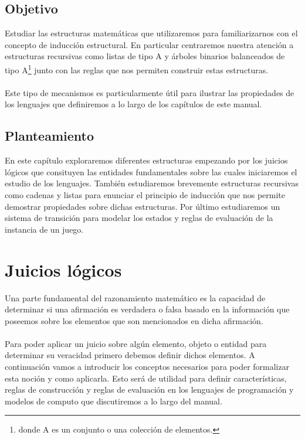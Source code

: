 \subsection*{Objetivo}
Estudiar las estructuras matemáticas que utilizaremos para familiarizarnos con el concepto de inducción estructural. En particular centraremos nuestra atención a estructuras recursivas como listas de tipo A y árboles binarios balanceados de tipo A\footnote{donde A es un conjunto o una colección de elementos.} junto con las reglas que nos permiten construir estas estructuras.\\\\
Este tipo de mecanismos es particularmente útil para ilustrar las propiedades de los lenguajes que definiremos a lo largo de los capítulos de este manual.

\subsection*{Planteamiento}
En este capítulo exploraremos diferentes estructuras empezando por los juicios lógicos que consituyen las entidades fundamentales sobre las cuales iniciaremos el estudio de los lenguajes.
También estudiaremos brevemente estructuras recursivas como cadenas y listas para enunciar el principio de inducción que nos permite demostrar propiedades sobre dichas estructuras. Por último estudiaremos un sistema de transición para modelar los estados y reglas de evaluación de la instancia de un juego.

\section{Juicios lógicos}

    Una parte fundamental del razonamiento matemático es la capacidad de determinar si una afirmación es verdadera o falsa basado en la información que poseemos sobre los elementos que son mencionados en dicha afirmación. \\\\
    Para poder aplicar un juicio sobre algún elemento, objeto o entidad para determinar su veracidad primero debemos definir dichos elementos. A continuación vamos a introducir los conceptos necesarios para poder formalizar esta noción y como aplicarla. Esto será de utilidad para definir características, reglas de construcción y reglas de evaluación en los lenguajes de programación y modelos de computo que discutiremos a lo largo del manual.\\

